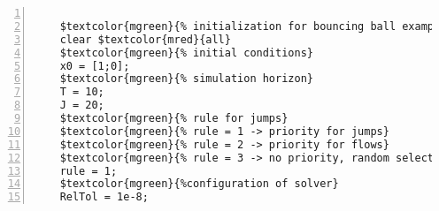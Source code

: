 %  
%  
%  
%  
  
  
\DefineShortVerb[fontfamily=courier,fontseries=m]{\$} 
\DefineShortVerb[fontfamily=courier,fontseries=b]{\#} 
  
\begin{Verbatim}[commandchars=\$\{\},numbers=left,numbersep=2pt] 

    $textcolor{mgreen}{% initialization for bouncing ball example} 
    clear $textcolor{mred}{all} 
    $textcolor{mgreen}{% initial conditions} 
    x0 = [1;0]; 
    $textcolor{mgreen}{% simulation horizon} 
    T = 10; 
    J = 20; 
    $textcolor{mgreen}{% rule for jumps} 
    $textcolor{mgreen}{% rule = 1 -> priority for jumps} 
    $textcolor{mgreen}{% rule = 2 -> priority for flows} 
    $textcolor{mgreen}{% rule = 3 -> no priority, random selection when simultaneous conditions} 
    rule = 1; 
    $textcolor{mgreen}{%configuration of solver} 
    RelTol = 1e-8;  
\end{Verbatim}  
  
\UndefineShortVerb{\$} 
\UndefineShortVerb{\#} 
 